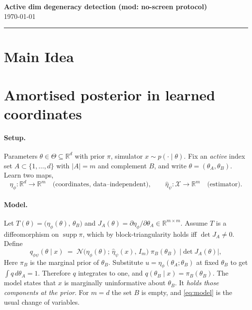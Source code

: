 \documentclass[11pt, letterpaper]{article}
\newcommand{\MyName}{T. Lucas Makinen}
\newcommand{\MyInstitution}{University of Cambridge}
\newcommand{\MyCourse}{Active dim degeneracy detection (mod: no-screen protocol)}
\newcommand{\MyDate}{\today}
\theoremstyle{definition}
\begin{document}
\begin{center}
    {\Large \textbf{\MyCourse}} \\ [0.5em]
    {\small \MyDate}
\end{center}
\hrule
\vspace{1em}

\vspace{1em}

\section*{Main Idea}

\section*{Amortised posterior in learned coordinates}

\paragraph{Setup.}
Parameters $\theta\in\Theta\subseteq\mathbb{R}^d$ with prior $\pi$, simulator
$x\sim p(\cdot\mid\theta)$. Fix an \emph{active} index set
$A\subset\{1,\dots,d\}$ with $|A|=m$ and complement $B$, and write
$\theta=(\theta_A,\theta_B)$. Learn two maps,
\[
  \eta_\phi:\mathbb{R}^d\to\mathbb{R}^m
  \quad\text{(coordinates, data--independent)},
  \qquad
  \hat\eta_\psi:\mathcal{X}\to\mathbb{R}^m
  \quad\text{(estimator)} .
\]

\paragraph{Model.}
Let $T(\theta)=\bigl(\eta_\phi(\theta),\,\theta_B\bigr)$ and
$J_A(\theta)=\partial\eta_\phi/\partial\theta_A\in\mathbb{R}^{m\times m}$.
Assume $T$ is a diffeomorphism on $\operatorname{supp}\pi$, which by
block-triangularity holds iff $\det J_A\neq0$. Define
\begin{equation}
  q_{\phi\psi}(\theta\mid x)
  \;=\;
  \mathcal{N}\bigl(\eta_\phi(\theta);\,\hat\eta_\psi(x),\,I_m\bigr)\;
  \pi_B(\theta_B)\;
  \bigl|\det J_A(\theta)\bigr| ,
  \label{eq:model}
\end{equation}
Here $\pi_B$ is the marginal prior of $\theta_B$. Substitute
$u=\eta_\phi(\theta_A;\theta_B)$ at fixed $\theta_B$ to get
$\int q\,d\theta_A=1$. Therefore $q$ integrates to one, and
$q(\theta_B\mid x)=\pi_B(\theta_B)$. The model states that $x$ is marginally
uninformative about $\theta_B$. It \emph{holds those components at the prior}.
For $m=d$ the set $B$ is empty, and \eqref{eq:model} is the usual change of
variables.
\end{document}
